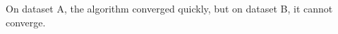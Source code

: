 \begin{answer}
    
    On dataset A, the algorithm converged quickly, but on dataset B, it cannot converge.
\end{answer}
